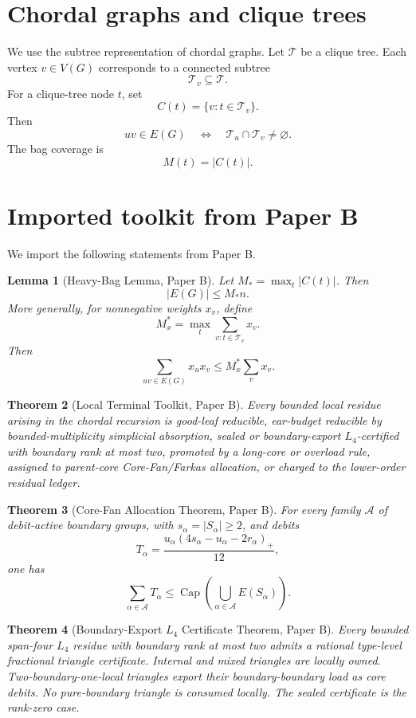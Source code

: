 \documentclass[11pt]{article}
\newtheorem{theorem}{Theorem}[section]
\newtheorem{lemma}[theorem]{Lemma}
\theoremstyle{definition}
\newcommand{\CoreCap}{\operatorname{Cap}}
\newcommand{\calT}{\mathcal T}
\newcommand{\calA}{\mathcal A}
\begin{document}
\section{Chordal graphs and clique trees}

We use the subtree representation of chordal graphs. Let \(\calT\) be a clique tree. Each vertex \(v\in V(G)\) corresponds to a connected subtree
\[
    \calT_v\subseteq\calT.
\]
For a clique-tree node \(t\), set
\[
    C(t)=\{v:t\in\calT_v\}.
\]
Then
\[
    uv\in E(G)
    \quad\Longleftrightarrow\quad
    \calT_u\cap\calT_v\neq\varnothing.
\]
The bag coverage is
\[
    M(t)=|C(t)|.
\]

\section{Imported toolkit from Paper B}\label{sec:imported-toolkit}

We import the following statements from Paper B.

\begin{lemma}[Heavy-Bag Lemma, Paper B]\label{lem:import-heavy}
Let \(M_* = \max_t |C(t)|\). Then
\[
    |E(G)|\le M_* n.
\]
More generally, for nonnegative weights \(x_v\), define
\[
    M_x^*
    =
    \max_t\sum_{v:t\in\calT_v}x_v.
\]
Then
\[
    \sum_{uv\in E(G)}x_ux_v
    \le
    M_x^*\sum_vx_v.
\]
\end{lemma}

\begin{theorem}[Local Terminal Toolkit, Paper B]\label{thm:import-toolkit}
Every bounded local residue arising in the chordal recursion is good-leaf reducible, ear-budget reducible by bounded-multiplicity simplicial absorption, sealed or boundary-export \(L_4\)-certified with boundary rank at most two, promoted by a long-core or overload rule, assigned to parent-core Core-Fan/Farkas allocation, or charged to the lower-order residual ledger.
\end{theorem}

\begin{theorem}[Core-Fan Allocation Theorem, Paper B]\label{thm:import-core-fan}
For every family \(\calA\) of debit-active boundary groups, with \(s_\alpha=|S_\alpha|\ge2\), and debits
\[
    T_\alpha
    =
    \frac{u_\alpha(4s_\alpha-u_\alpha-2r_\alpha)_+}{12},
\]
one has
\[
    \sum_{\alpha\in\calA}T_\alpha
    \le
    \CoreCap
    \left(
    \bigcup_{\alpha\in\calA}E(S_\alpha)
    \right).
\]
\end{theorem}

\begin{theorem}[Boundary-Export \(L_4\) Certificate Theorem, Paper B]\label{thm:import-l4}
Every bounded span-four \(L_4\) residue with boundary rank at most two admits a rational type-level fractional triangle certificate. Internal and mixed triangles are locally owned. Two-boundary-one-local triangles export their boundary-boundary load as core debits. No pure-boundary triangle is consumed locally. The sealed certificate is the rank-zero case.
\end{theorem}
\end{document}
